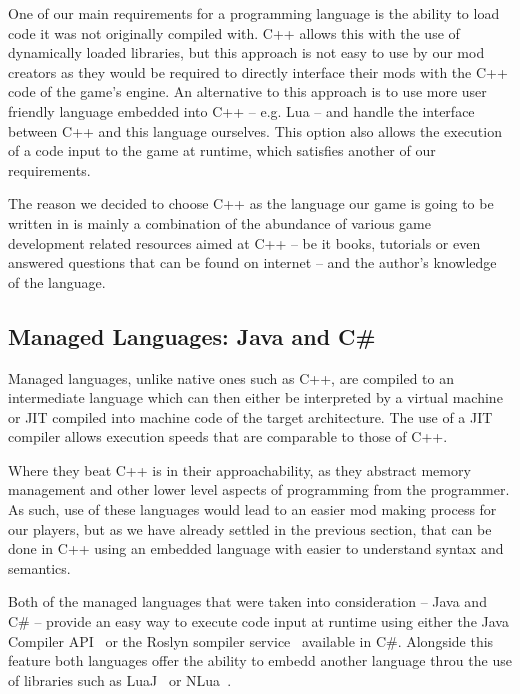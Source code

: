 One of our main requirements for a programming language is the ability to load code it was not originally compiled with. C++ allows this
with the use of dynamically loaded libraries, but this approach is not easy to use by our mod creators as they would be required to
directly interface their mods with the C++ code of the game's engine. An alternative to this approach is to use more user friendly
language embedded into C++ -- e.g. Lua -- and handle the interface between C++ and this language ourselves. This option also
allows the execution of a code input to the game at runtime, which satisfies another of our requirements.

The reason we decided to choose C++ as the language our game is going to be written in is mainly a combination of the abundance of
various game development related resources aimed at C++ -- be it books, tutorials or even answered questions that can be found
on internet -- and the author's knowledge of the language.

\subsection{Managed Languages: Java and C\#}

Managed languages, unlike native ones such as C++, are compiled to an intermediate language which can then either
be interpreted by a virtual machine or JIT compiled into machine code of the target architecture. The use
of a JIT compiler allows execution speeds that are comparable to those of C++.

Where they beat C++ is in their approachability, as they abstract memory management and other lower level aspects of programming
from the programmer. As such, use of these languages would lead to an easier mod making process for our players, but as
we have already settled in the previous section, that can be done in C++ using an embedded language with easier to
understand syntax and semantics.

Both of the managed languages that were taken into consideration -- Java and C\# -- provide an easy way to execute code input
at runtime using either the Java Compiler API~\cite{JavaCompAPI} or the Roslyn sompiler service~\cite{Roslyn} available in C\#.
Alongside this feature both languages offer the ability to embedd another language throu the use of libraries such as
LuaJ~\cite{LuaJ} or NLua~\cite{NLua}.

